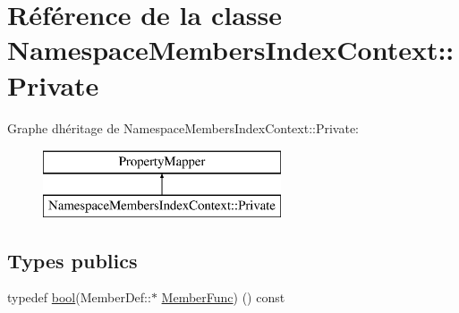 \hypertarget{class_namespace_members_index_context_1_1_private}{}\section{Référence de la classe Namespace\+Members\+Index\+Context\+:\+:Private}
\label{class_namespace_members_index_context_1_1_private}
Graphe d\textquotesingle{}héritage de Namespace\+Members\+Index\+Context\+:\+:Private\+:\begin{figure}[H]
\begin{center}
\leavevmode
\includegraphics[height=2.000000cm]{class_namespace_members_index_context_1_1_private}
\end{center}
\end{figure}
\subsection*{Types publics}
\begin{DoxyCompactItemize}
\item 
typedef \hyperlink{qglobal_8h_a1062901a7428fdd9c7f180f5e01ea056}{bool}(Member\+Def\+::$\ast$ \hyperlink{class_namespace_members_index_context_1_1_private_a40a77005bcf88756302b2ebf92a88a8e}{Member\+Func}) () const 
\end{DoxyCompactItemize}
